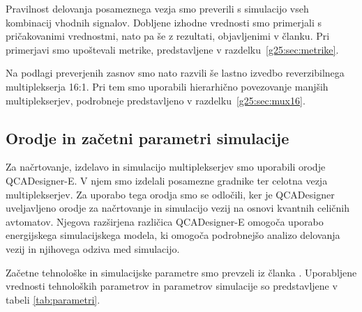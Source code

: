 \documentclass[graybox, envcountchap]{svmult}
\begin{document}
Pravilnost delovanja posameznega vezja smo preverili s simulacijo vseh kombinacij vhodnih signalov. Dobljene izhodne vrednosti smo primerjali s pričakovanimi vrednostmi, nato pa še z rezultati, objavljenimi v članku. Pri primerjavi smo upoštevali metrike, predstavljene v razdelku~\ref{g25:sec:metrike}.

Na podlagi preverjenih zasnov smo nato razvili še lastno izvedbo reverzibilnega multiplekserja 16:1. Pri tem smo uporabili hierarhično povezovanje manjših multiplekserjev, podrobneje predstavljeno v razdelku~\ref{g25:sec:mux16}.
 
\subsection{Orodje in začetni parametri simulacije}
\label{g25:sec:orodja}

Za načrtovanje, izdelavo in simulacijo multiplekserjev smo uporabili orodje QCADesigner-E. V njem smo izdelali posamezne gradnike ter celotna vezja multiplekserjev. Za uporabo tega orodja smo se odločili, ker je QCADesigner uveljavljeno orodje za načrtovanje in simulacijo vezij na osnovi kvantnih celičnih avtomatov. Njegova razširjena različica QCADesigner-E omogoča uporabo energijskega simulacijskega modela, ki omogoča podrobnejšo analizo delovanja vezij in njihovega odziva med simulacijo.

Začetne tehnološke in simulacijske parametre smo prevzeli iz članka \cite{alharbi2024}. Uporabljene vrednosti tehnoloških parametrov in parametrov simulacije so predstavljene v tabeli \ref{tab:parametri}.
\end{document}
